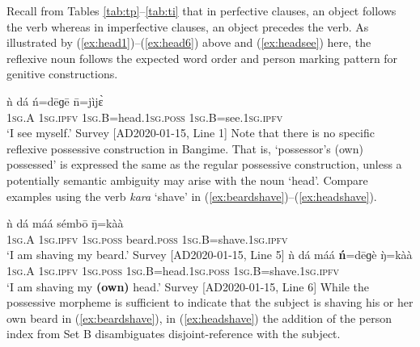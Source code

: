 \documentclass[output=paper]{langscibook}
\begin{document}
Recall from Tables \ref{tab:tp}--\ref{tab:ti} that in perfective clauses, an object follows the verb whereas in imperfective clauses, an object precedes the verb. As illustrated by  (\ref{ex:head1})--(\ref{ex:head6}) above and (\ref{ex:headsee}) here, the reflexive noun follows the expected word order and person marking pattern for genitive constructions.
\ea \label{ex:headsee}

\gll ǹ dá ń=dēɡē n̄=jìjɛ̀ \\
1\textsc{sg}.A 1\textsc{sg}.\textsc{ipfv} 1\textsc{sg}.B=head.1\textsc{sg}.\textsc{poss} 1\textsc{sg}.B=see.1\textsc{sg}.\textsc{ipfv}  \\
\glt `I see myself.' Survey [AD2020-01-15, Line 1]
\z
Note that there is no specific reflexive possessive construction in Bangime. That is, `possessor's (own) possessed' is expressed the same as the regular possessive construction, unless a potentially semantic ambiguity may arise with the noun `head'. Compare examples using the verb \textit{kara} `shave' in (\ref{ex:beardshave})--(\ref{ex:headshave}).
\ea \label{ex:beardshave}

\gll ǹ dá máá sémbō ŋ̄=kàà \\
1\textsc{sg}.A 1\textsc{sg}.\textsc{ipfv} 1\textsc{sg}.\textsc{poss} beard.\textsc{poss} 1\textsc{sg}.B=shave.1\textsc{sg}.\textsc{ipfv} \\
\glt `I am shaving my beard.' Survey [AD2020-01-15, Line 5]
\z
\ea \label{ex:headshave}
\gll ǹ dá máá \textbf{ń}=dēɡè ŋ̀=kàà \\
	1\textsc{sg}.A  1\textsc{sg}.\textsc{ipfv}  1\textsc{sg}.\textsc{poss} 1\textsc{sg}.B=head.1\textsc{sg}.\textsc{poss} 1\textsc{sg}.B=shave.1\textsc{sg}.\textsc{ipfv} \\
	\glt `I am shaving my \textbf{(own)} head.' Survey [AD2020-01-15, Line 6]
	\z
While the possessive morpheme is sufficient to indicate that the subject is shaving his or her own beard in (\ref{ex:beardshave}), in (\ref{ex:headshave}) the addition of the person index from Set B disambiguates disjoint-reference with the subject. 
\end{document}
